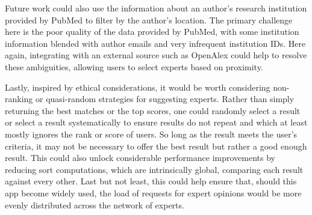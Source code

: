 Future work could also use the information about an author's research institution provided by PubMed to filter by the author's location. The primary challenge here is the poor quality of the data provided by PubMed, with some institution information blended with author emails and very infrequent institution IDs. Here again, integrating with an external source such as OpenAlex could help to resolve these ambiguities, allowing users to select experts based on proximity. 

Lastly, inspired by ethical considerations, it would be worth considering non-ranking or quasi-random strategies for suggesting experts. Rather than simply returning the best matches or the top scores, one could randomly select a result or select a result systematically to ensure results do not repeat and which at least mostly ignores the rank or score of users. So long as the result meets the user's criteria, it may not be necessary to offer the best result but rather a good enough result. This could also unlock considerable performance improvements by reducing sort computations, which are intrinsically global, comparing each result against every other. Last but not least, this could help ensure that, should this app become widely used, the load of requests for expert opinions would be more evenly distributed across the network of experts. 